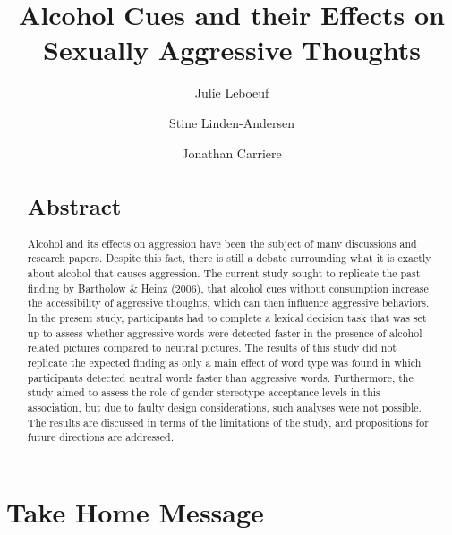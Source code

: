 \documentclass[serif, authorddate, twocolumn, empirical]{jote-article}
\title{Alcohol Cues and their Effects on Sexually Aggressive Thoughts}
\author[1]{Julie Leboeuf}
\author[1]{Stine Linden-Andersen}
\author[1]{Jonathan Carriere}
\affil[1]{Department of Psychology, Bishop’s University, Sherbrooke, Quebec, J1M 1Z7, Canada}
\begin{document}
\begin{frontmatter}
\maketitle

\begin{abstract}
\section*{Abstract}

\noindent Alcohol and its effects on aggression have been the subject of many discussions and research papers. Despite this fact, there is still a debate surrounding what it is exactly about alcohol that causes aggression. The current study sought to replicate the past finding by Bartholow \& Heinz (2006), that alcohol cues without consumption increase the accessibility of aggressive thoughts, which can then influence aggressive behaviors. In the present study, participants had to complete a lexical decision task that was set up to assess whether aggressive words were detected faster in the presence of alcohol-related pictures compared to neutral pictures. The results of this study did not replicate the expected finding as only a main effect of word type was found in which participants detected neutral words faster than aggressive words. Furthermore, the study aimed to assess the role of gender stereotype acceptance levels in this association, but due to faulty design considerations, such analyses were not possible. The results are discussed in terms of the limitations of the study, and propositions for future directions are addressed. 

\end{abstract}
\end{frontmatter}

{}
\section*{Take Home Message} %
\label{sec:take-home}
\end{document}
